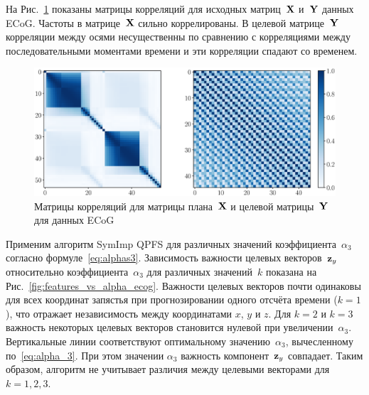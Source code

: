 На Рис.~\ref{fig:corr_matrix} показаны матрицы корреляций для исходных матриц~$\mathbf{X}$ и~$\mathbf{Y}$ данных ECoG. Частоты в матрице~$\mathbf{X}$ сильно коррелированы. 
В целевой матрице~$\mathbf{Y}$ корреляции между осями несущественны по сравнению с корреляциями между последовательными моментами времени и эти корреляции спадают со временем.
\begin{figure}[ht]
	\includegraphics[width=\linewidth]{figs/ch2/corr_matrix}
	\caption{Матрицы корреляций для матрицы плана~$\mathbf{X}$ и целевой матрицы~$\mathbf{Y}$ для данных ECoG}
	\label{fig:corr_matrix}
\end{figure}

Применим алгоритм SymImp QPFS для различных значений коэффициента~$\alpha_3$ согласно формуле~\eqref{eq:alphas3}.
Зависимость важности целевых векторов~$\mathbf{z}_y$ относительно коэффициента~$\alpha_3$ для различных значений~$k$ показана на Рис.~\ref{fig:features_vs_alpha_ecog}.
Важности целевых векторов почти одинаковы для всех координат запястья при прогнозировании одного отсчёта времени ($k = 1$), 
что отражает независимость между координатами $x$, $y$ и $z$.
Для $k = 2$ и $k = 3$ важность некоторых целевых векторов становится нулевой при увеличении~$\alpha_3$.
Вертикальные линии соответствуют оптимальному значению~$\alpha_3$, вычесленному по~\eqref{eq:alpha_3}. 
При этом значении $\alpha_3$ важность компонент~$\mathbf{z}_y$ совпадает. 
Таким образом, алгоритм не учитывает различия между целевыми векторами для $k=1, 2, 3$.

